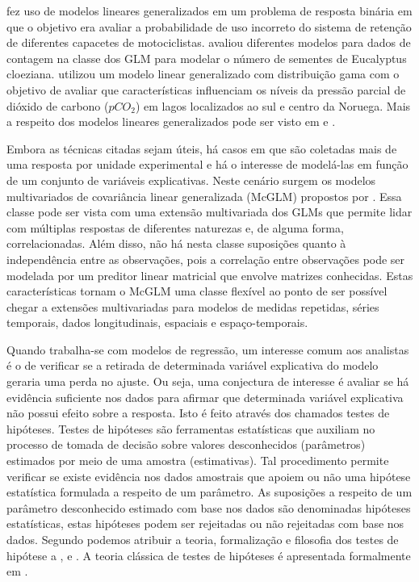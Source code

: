 \citet{capacete} fez uso de modelos lineares generalizados em um problema de resposta binária em que o objetivo era avaliar a probabilidade de uso incorreto do sistema de retenção de diferentes capacetes de motociclistas. \citet{euc} avaliou diferentes modelos para dados de contagem na classe dos GLM para modelar o número de sementes de Eucalyptus cloeziana. \citet{pco2} utilizou um modelo linear generalizado com distribuição gama com o objetivo de avaliar que características influenciam os níveis da pressão
parcial de dióxido de carbono ($pCO_2$) em lagos localizados ao sul e centro da Noruega. Mais a respeito dos modelos lineares generalizados pode ser visto em \citet{paula} e \citet{cordeiro}.

Embora as técnicas citadas sejam úteis, há casos em que são coletadas mais de uma resposta por unidade experimental e há o interesse de modelá-las em função de um conjunto de variáveis explicativas. Neste cenário surgem os modelos multivariados de covariância linear generalizada (McGLM) propostos por \citet{Bonat16}. Essa classe pode ser vista com uma extensão multivariada dos GLMs que permite lidar com múltiplas respostas de diferentes naturezas e, de alguma forma, correlacionadas. Além disso, não há nesta classe suposições quanto à independência entre as observações, pois a correlação entre observações pode ser modelada por um preditor linear matricial que envolve matrizes conhecidas. Estas características tornam o McGLM uma classe flexível ao ponto de ser possível chegar a extensões multivariadas para modelos de medidas repetidas, séries temporais, dados longitudinais, espaciais e espaço-temporais.


Quando trabalha-se com modelos de regressão, um interesse comum aos analistas é o de verificar se a retirada de determinada variável explicativa do modelo geraria uma perda no ajuste. Ou seja, uma conjectura de interesse é avaliar se há evidência suficiente nos dados para afirmar que determinada variável explicativa não possui efeito sobre a resposta. Isto é feito através dos chamados testes de hipóteses. Testes de hipóteses são ferramentas estatísticas que auxiliam no processo de tomada de decisão sobre valores desconhecidos (parâmetros) estimados por meio de uma amostra (estimativas). Tal procedimento permite verificar se existe evidência nos dados amostrais que apoiem ou não uma hipótese estatística formulada a respeito de um parâmetro. As suposições a respeito de um parâmetro desconhecido estimado com base nos dados são denominadas hipóteses estatísticas, estas hipóteses podem ser rejeitadas ou não rejeitadas com base nos dados. Segundo \citet{lehmann} podemos atribuir a teoria, formalização e filosofia dos testes de hipótese a \citet{neyman1}, \citet{neyman2} e \citet{fisher}. A teoria clássica de testes de hipóteses é apresentada formalmente em \citet{lehmann2}.

